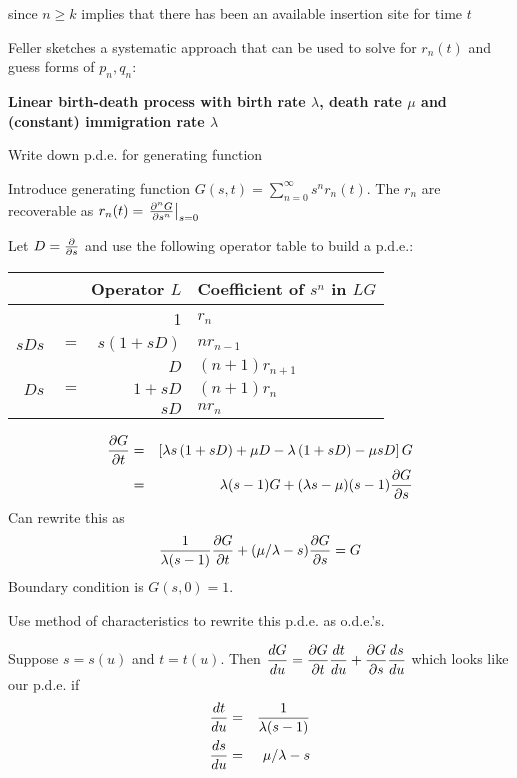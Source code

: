 \documentclass{beamer}
\begin{document}
\begin{frame}{}
since $n \geq k$ implies that there has been an available insertion site for time $t$
 \item Feller sketches a systematic approach that can be used to solve for $r_n(t)$ and guess forms of $p_n,q_n$:
  \itemb
   \item {\bf Linear birth-death process with birth rate $\lambda$, death rate $\mu$ and (constant) immigration rate $\lambda$}
  \item Write down p.d.e. for generating function
   \itemb
   \item Introduce generating function $G(s,t) = \sum_{n=0}^\infty s^n r_n(t)$.
The $r_n$ are recoverable as $r_n(t) = \left. \frac{\partial^{n} {G}}{\partial {s}^{n}} \right|_{s=0}$
   \item Let $D = \frac{\partial}{\partial {s}}$ and use the following operator table to build a p.d.e.:
\begin{tabular}{|rcr|l|}
\hline
\multicolumn{3}{|r|}{Operator $L$}  & Coefficient of $s^n$ in $LG$ \\
\hline
& & 1 & $r_n$ \\
$s D s$ & $=$ & $s \left( 1 + s D \right)$ & $n r_{n-1}$ \\
& & $D$ & $(n+1) r_{n+1}$ \\
$D s$ & $=$ & $1 + s D$ & $(n+1) r_n$ \\
& & $s D$ & $n r_n$ \\
\hline
\end{tabular}
\begin{eqnarray*}
\frac{\partial {G}}{\partial {t}} & = & \left[ \lambda s \left( 1 + s D \right) + \mu D - \lambda \left( 1 + s D \right) - \mu s D \right] G \\
& = & \lambda(s-1) G + (\lambda s - \mu)(s-1) \frac{\partial {G}}{\partial {s}}
\end{eqnarray*}
Can rewrite this as
\[
\frac{1}{\lambda(s-1)} \frac{\partial {G}}{\partial {t}} + (\mu/\lambda - s) \frac{\partial {G}}{\partial {s}} = G
\]
Boundary condition is $G(s,0) = 1$.
   \item 
   \iteme
  \item Use method of characteristics to rewrite this p.d.e. as o.d.e.'s.
   \itemb
   \item Suppose $s=s(u)$ and $t=t(u)$. Then
$\displaystyle
\frac{d {G}}{d {u}} = \frac{\partial {G}}{\partial {t}} \frac{d {t}}{d {u}} + \frac{\partial {G}}{\partial {s}} \frac{d {s}}{d {u}}
$
which looks like our p.d.e. if
\begin{eqnarray*}
\deriv{t}{u} & = & \frac{1}{\lambda (s-1)} \\
\deriv{s}{u} & = & \mu/\lambda - s \\

\end{eqnarray*}
\end{frame}
\end{document}
